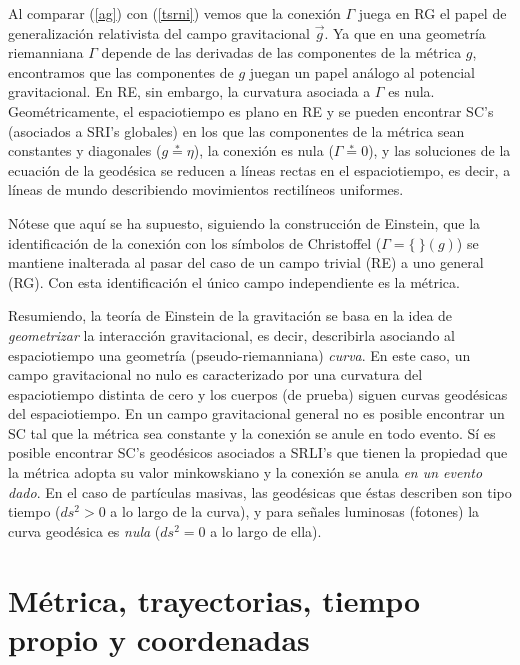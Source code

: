 Al comparar (\ref{ag}) con (\ref{tsrni}) vemos que la conexión $\Gamma$ juega en RG el papel de generalización relativista del campo gravitacional $\vec{g}$. Ya que en una geometría riemanniana $\Gamma$ depende de las derivadas de las componentes de la métrica $g$, encontramos que las componentes de $g$ juegan un papel análogo al potencial gravitacional. En RE, sin embargo, la curvatura asociada a $\Gamma$ es nula. Geométricamente, el espaciotiempo es plano en RE y se pueden encontrar SC's (asociados a SRI's globales) en los que las componentes de la métrica sean constantes y diagonales ($g\stackrel{*}{=}\eta$), la conexión es nula ($\Gamma\stackrel{*}{=}0$), y las soluciones de la ecuación de la geodésica se reducen a líneas rectas en el espaciotiempo, es decir, a líneas de mundo describiendo movimientos rectilíneos uniformes. 

Nótese que aquí se ha supuesto, siguiendo la construcción de
Einstein, que la identificación de la conexión con los símbolos de Christoffel ($\Gamma %
=\{\ \}(g)$) se mantiene inalterada al pasar del caso de un campo
trivial (RE) a uno general (RG). Con esta identificación el único campo
independiente es la métrica.


Resumiendo, la teoría de Einstein de la gravitación se basa en la idea de
\textit{geometrizar} la interacción gravitacional, es decir, describirla
asociando al espaciotiempo una geometría (pseudo-riemanniana) \textit{curva}. En este caso, un campo gravitacional no nulo es caracterizado por una curvatura del espaciotiempo distinta de cero y los cuerpos (de prueba) siguen curvas geodésicas del espaciotiempo. En un campo gravitacional general no es posible encontrar un SC tal que la métrica sea constante y la conexión se anule en todo evento. Sí es posible encontrar SC's geodésicos asociados a SRLI's que tienen la propiedad que la métrica adopta su valor minkowskiano y la conexión se anula \textit{en un evento dado}.  En el caso de partículas masivas, las geodésicas que éstas describen son tipo tiempo ($ds^2>0$ a lo largo de la curva), y para señales luminosas (fotones) la curva geodésica es \textit{nula} ($ds^2=0$ a lo largo de ella).


\section{Métrica, trayectorias, tiempo propio y coordenadas}


